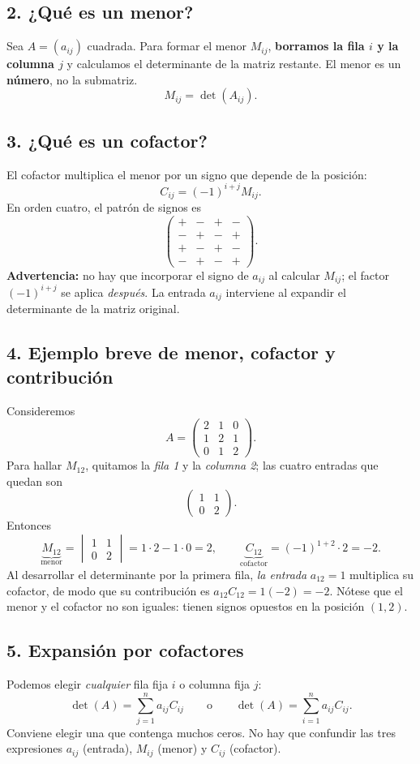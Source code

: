 \documentclass[12pt]{article}
\theoremstyle{remark}
\begin{document}
\subsection*{2. ¿Qué es un menor?}
Sea $A=(a_{ij})$ cuadrada. Para formar el menor $M_{ij}$, \textbf{borramos la fila $i$ y la columna $j$} y calculamos el determinante de la matriz restante. El menor es un \textbf{número}, no la submatriz.
\[M_{ij}=\det(A_{ij}).\]
\subsection*{3. ¿Qué es un cofactor?}
El cofactor multiplica el menor por un signo que depende de la posición:
\[\boxed{C_{ij}=(-1)^{i+j}M_{ij}}.\]
En orden cuatro, el patrón de signos es
\[
\begin{pmatrix}
+&-&+&-\\
-&+&-&+\\
+&-&+&-\\
-&+&-&+
\end{pmatrix}.
\]
\textbf{Advertencia:} no hay que incorporar el signo de $a_{ij}$ al calcular $M_{ij}$; el factor $(-1)^{i+j}$ se aplica \emph{después}. La entrada $a_{ij}$ interviene al expandir el determinante de la matriz original.
\subsection*{4. Ejemplo breve de menor, cofactor y contribución}
Consideremos
\[
A=\begin{pmatrix}2&1&0\\1&2&1\\0&1&2\end{pmatrix}.
\]
Para hallar $M_{12}$, quitamos la \emph{fila 1} y la \emph{columna 2}; las cuatro entradas que quedan son
\[
\begin{pmatrix}1&1\\0&2\end{pmatrix}.
\]
Entonces
\[
\underbrace{M_{12}}_{\text{menor}}
=\begin{vmatrix}1&1\\0&2\end{vmatrix}=1\cdot2-1\cdot0=2,
\qquad
\underbrace{C_{12}}_{\text{cofactor}}=(-1)^{1+2}\cdot2=-2.
\]
Al desarrollar el determinante por la primera fila, \emph{la entrada} $a_{12}=1$ multiplica su cofactor, de modo que su contribución es $a_{12}C_{12}=1(-2)=-2$. Nótese que el menor y el cofactor no son iguales: tienen signos opuestos en la posición $(1,2)$.
\subsection*{5. Expansión por cofactores}
Podemos elegir \emph{cualquier} fila fija $i$ o columna fija $j$:
\[
\det(A)=\sum_{j=1}^{n}a_{ij}C_{ij}
\qquad\text{o}\qquad
\det(A)=\sum_{i=1}^{n}a_{ij}C_{ij}.
\]
Conviene elegir una que contenga muchos ceros. No hay que confundir las tres expresiones $a_{ij}$ (entrada), $M_{ij}$ (menor) y $C_{ij}$ (cofactor).
\end{document}
